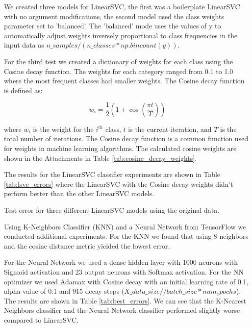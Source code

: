 We created three models for LinearSVC, the first was a boilerplate LinearSVC with no argument modifications, the second model used the class weights parameter set to 'balanced'. The 'balanced' mode uses the values of y to automatically adjust weights inversely proportional to class frequencies in the input data as $n\_samples / (n\_classes * np.bincount(y))$. 

For the third test we created a dictionary of weights for each class using the Cosine decay function. The weights for each category ranged from 0.1 to 1.0 where the most frequent classes had smaller weights. The Cosine decay function is defined as:

\begin{equation}
    w_i = \frac{1}{2} \left(1 + \cos \left(\frac{\pi t}{T}\right)\right)
\label{eq:cosine_decay}
\end{equation}

where $w_i$ is the weight for the $i^{th}$ class, $t$ is the current iteration, and $T$ is the total number of iterations. The Cosine decay function is a common function used for weights in machine learning algorithms. The calculated cosine weights are shown in the Attachments in Table \ref{tab:cosine_decay_weights}.

The results for the LinearSVC classifier experiments are shown in Table \ref{tab:lsvc_errors} where the LinearSVC with the Cosine decay weights didn't perform better than the other LinearSVC models.

\begin{table}[!ht]
\centering
\caption{Test error for three different LinearSVC models using the original data.}

\label{tab:lsvc_errors}
\end{table}

Using K-Neighbors Classifier (KNN) and a Neural Network from TensorFlow we conducted additional experiments. For the KNN we found that using 8 neighbors and the cosine distance metric yielded the lowest error. 

For the Neural Network we used a dense hidden-layer with 1000 neurons with Sigmoid activation and 23 output neurons with Softmax activation. For the NN optimizer we used Adamax with Cosine decay with an initial learning rate of 0.1, alpha value of 0.1 and 915 decay steps ($X\_data\_size // batch\_size * num_epochs$). The results are shown in Table \ref{tab:best_errors}. We can see that the K-Nearest Neighbors classifier and the Neural Network classifier performed slightly worse compared to LinearSVC.

